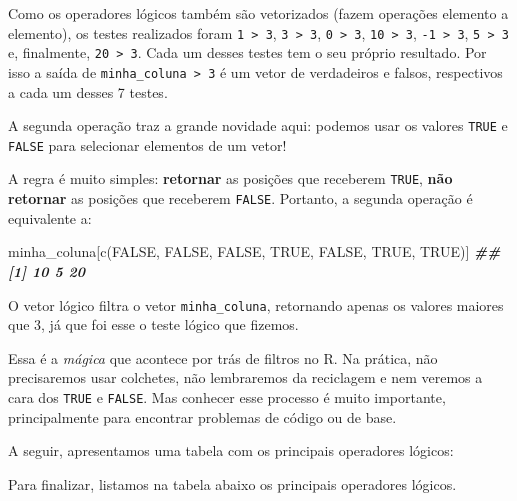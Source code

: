 \documentclass[
]{book}
\newenvironment{Shaded}{\begin{snugshade}}{\end{snugshade}}
\newcommand{\ConstantTok}[1]{\textcolor[rgb]{0.00,0.00,0.00}{#1}}
\newcommand{\DocumentationTok}[1]{\textcolor[rgb]{0.56,0.35,0.01}{\textbf{\textit{#1}}}}
\newcommand{\FunctionTok}[1]{\textcolor[rgb]{0.00,0.00,0.00}{#1}}
\newcommand{\NormalTok}[1]{#1}
\begin{document}
Como os operadores lógicos também são vetorizados (fazem operações elemento a elemento), os testes realizados foram \texttt{1\ \textgreater{}\ 3}, \texttt{3\ \textgreater{}\ 3}, \texttt{0\ \textgreater{}\ 3}, \texttt{10\ \textgreater{}\ 3}, \texttt{-1\ \textgreater{}\ 3}, \texttt{5\ \textgreater{}\ 3} e, finalmente, \texttt{20\ \textgreater{}\ 3}. Cada um desses testes tem o seu próprio resultado. Por isso a saída de \texttt{minha\_coluna\ \textgreater{}\ 3} é um vetor de verdadeiros e falsos, respectivos a cada um desses 7 testes.

A segunda operação traz a grande novidade aqui: podemos usar os valores \texttt{TRUE} e \texttt{FALSE} para selecionar elementos de um vetor!

A regra é muito simples: \textbf{retornar} as posições que receberem \texttt{TRUE}, \textbf{não retornar} as posições que receberem \texttt{FALSE}. Portanto, a segunda operação é equivalente a:

\begin{Shaded}
\begin{Highlighting}[]
\NormalTok{minha\_coluna[}\FunctionTok{c}\NormalTok{(}\ConstantTok{FALSE}\NormalTok{, }\ConstantTok{FALSE}\NormalTok{, }\ConstantTok{FALSE}\NormalTok{, }\ConstantTok{TRUE}\NormalTok{, }\ConstantTok{FALSE}\NormalTok{, }\ConstantTok{TRUE}\NormalTok{, }\ConstantTok{TRUE}\NormalTok{)]}
\DocumentationTok{\#\# [1] 10  5 20}
\end{Highlighting}
\end{Shaded}

O vetor lógico filtra o vetor \texttt{minha\_coluna}, retornando apenas os valores maiores que 3, já que foi esse o teste lógico que fizemos.

Essa é a \emph{mágica} que acontece por trás de filtros no R. Na prática, não precisaremos usar colchetes, não lembraremos da reciclagem e nem veremos a cara dos \texttt{TRUE} e \texttt{FALSE}. Mas conhecer esse processo é muito importante, principalmente para encontrar problemas de código ou de base.

A seguir, apresentamos uma tabela com os principais operadores lógicos:

Para finalizar, listamos na tabela abaixo os principais operadores lógicos.
\end{document}
